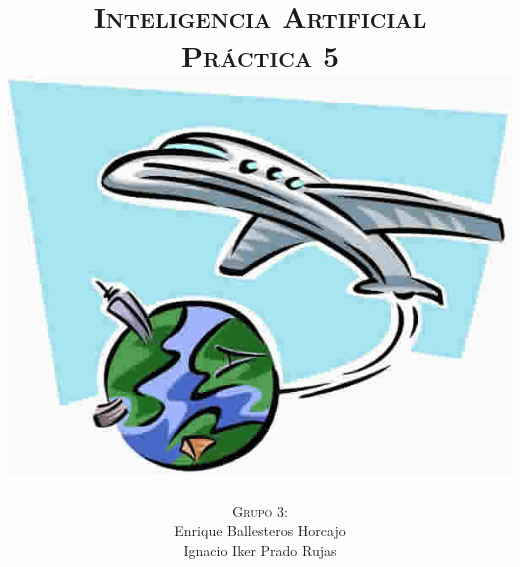 \documentclass[11pt, a4paper, spanish, openright, twoside]{book}
\begin{document}
 
\title{\Huge{\textsc{Inteligencia Artificial}} \\
	\vspace{0.7cm}
	 \textsc{\Large{Práctica 5}} \\
	\vspace{1.5cm}
	\includegraphics[scale=0.45]{viaje}}
\author{\textsc{Grupo 3:}\\
	Enrique Ballesteros Horcajo\\
	Ignacio Iker Prado Rujas}
\date{\Today}
\maketitle

\newpage
\mbox{}
\thispagestyle{empty}						%
\newpage


\tableofcontents 							%

\newpage
\mbox{}
\thispagestyle{empty}						%
\newpage


\vspace{3cm}


\newpage
\end{document}
